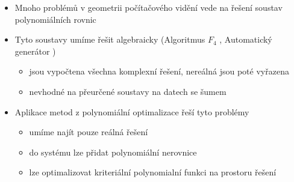 \documentclass[cmpiitalkstyle, 22pt]{cmptalk}
\newcommand{\ind}[1]{\ensuremath{^{(#1)}}}
\newcommand{\R}{\mathbb{R}}
\newcommand{\N}{\mathbb{N}}
\begin{document}
\begin{cmptalkslide}[Motivace]
  \begin{itemize}
    \item Mnoho problémů v geometrii počítačového vidění vede na řešení soustav polynomiálních rovnic
    \item Tyto soustavy umíme řešit algebraicky (Algoritmus $F_4$ \cite{F4}, Automatický generátor \cite{AutoGen})
    \begin{itemize}
      \item jsou vypočtena všechna komplexní řešení, nereálná jsou poté vyřazena
      \item nevhodné na přeurčené soustavy na datech se šumem
    \end{itemize}
    \item Aplikace metod z polynomiální optimalizace řeší tyto problémy
    \begin{itemize}
      \item umíme najít pouze reálná řešení
      \item do systému lze přidat polynomiální nerovnice
      \item lze optimalizovat kriteriální polynomialní funkci na prostoru řešení
    \end{itemize}
  \end{itemize}


\end{cmptalkslide}

\end{document}
